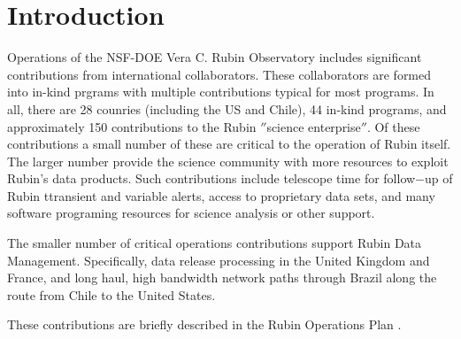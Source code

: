 \section{Introduction}

Operations of the NSF-DOE Vera C. Rubin Observatory includes significant contributions from international collaborators. These collaborators are formed into in-kind prgrams with multiple contributions typical for most programs. In all, there are 28 counries (including the US and Chile), 44 in-kind programs, and approximately 150 contributions to the Rubin $''$science enterprise$''$. Of these contributions a small number of these are critical to the operation of Rubin itself. The larger number provide the science community with more resources to exploit Rubin's data products. Such contributions include telescope time for follow$-$up of Rubin ttransient and variable alerts, access to proprietary data sets, and many software programing resources for science analysis or other support. 

The smaller number of critical operations contributions support Rubin Data Management. Specifically, data release processing in the United Kingdom and France, and long haul, high bandwidth network paths through Brazil along the route from Chile to the United States.

These contributions are briefly described in the Rubin Operations Plan \citep{RDO-018}.
